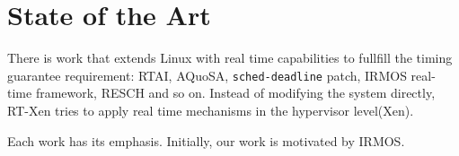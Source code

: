 \section{State of the Art}

There is work that extends Linux with real time capabilities to fullfill 
the timing guarantee requirement: RTAI\cite{rtai}, AQuoSA\cite{Luigi09}, 
\texttt{sched-deadline} patch\cite{Dario09}, 
IRMOS real-time framework, RESCH and so on.
%
%
Instead of modifying the system directly, RT-Xen tries to apply real 
time mechanisms in the hypervisor level(Xen). 

Each work has its emphasis. Initially, our work is motivated by
IRMOS. 

%
%

